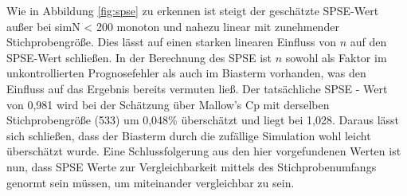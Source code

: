 Wie in Abbildung \ref{fig:spse} zu erkennen ist steigt der geschätzte SPSE-Wert außer bei simN < 200 monoton und nahezu linear mit zunehmender Stichprobengröße. Dies lässt auf einen starken linearen Einfluss von $n$ auf den SPSE-Wert schließen. In der Berechnung des SPSE ist $n$ sowohl als Faktor im unkontrollierten Prognosefehler als auch im Biasterm vorhanden, was den Einfluss auf das Ergebnis bereits vermuten ließ.
Der tatsächliche SPSE - Wert von 0,981 wird bei der Schätzung über Mallow's Cp mit derselben Stichprobengröße (533) um 0,048\% überschätzt und liegt bei 1,028. 
Daraus lässt sich schließen, dass der Biasterm durch die zufällige Simulation wohl leicht überschätzt wurde.
Eine Schlussfolgerung aus den hier vorgefundenen Werten ist nun, dass SPSE Werte zur Vergleichbarkeit mittels des Stichprobenumfangs genormt sein müssen, um miteinander vergleichbar zu sein.